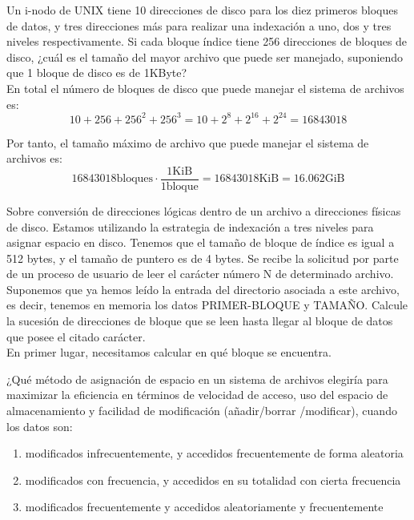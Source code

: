 \begin{ejercicio}
Un i-nodo de UNIX tiene 10 direcciones de disco para los diez primeros bloques de datos, y tres direcciones más para realizar una indexación a uno, dos y tres niveles respectivamente.
Si cada bloque índice tiene 256 direcciones de bloques de disco, ¿cuál es el tamaño del mayor archivo que puede ser manejado, suponiendo que 1 bloque de disco es de 1KByte?\\
    
    En total el número de bloques de disco que puede manejar el sistema de archivos es:
    \begin{equation}
        10 + 256 + 256^2 + 256^3 = 10 + 2^{8} + 2^{16} + 2^{24} = 16843018
    \end{equation}

    Por tanto, el tamaño máximo de archivo que puede manejar el sistema de archivos es:
    \begin{equation}
        16843018 \text{bloques} \cdot \frac{1 \text{KiB}}{1 \text{bloque}} = 16843018 \text{KiB} = 16.062 \text{GiB}
    \end{equation}
\end{ejercicio}

\begin{ejercicio}
Sobre conversión de direcciones lógicas dentro de un archivo a direcciones físicas de disco.
Estamos utilizando la estrategia de indexación a tres niveles para asignar espacio en disco.
Tenemos que el tamaño de bloque de índice es igual a 512 bytes, y el tamaño de puntero es de 4 bytes.
Se recibe la solicitud por parte de un proceso de usuario de leer el carácter número N de determinado archivo.
Suponemos que ya hemos leído la entrada del directorio asociada a este archivo, es decir, tenemos en memoria los datos
PRIMER-BLOQUE y TAMAÑO. Calcule la sucesión de direcciones de bloque que se leen hasta llegar al bloque de datos que posee
el citado carácter.\\

En primer lugar, necesitamos calcular en qué bloque se encuentra. 
\end{ejercicio}

\begin{ejercicio}
¿Qué método de asignación de espacio en un sistema de archivos elegiría para maximizar la eficiencia en términos de velocidad de acceso, uso del espacio de almacenamiento y facilidad de modificación (añadir/borrar /modificar), cuando los datos son:
\begin{enumerate}
    \item modificados infrecuentemente, y accedidos frecuentemente de forma aleatoria
    \item modificados con frecuencia, y accedidos en su totalidad con cierta frecuencia
    \item modificados frecuentemente y accedidos aleatoriamente y frecuentemente
\end{enumerate}
\end{ejercicio}

